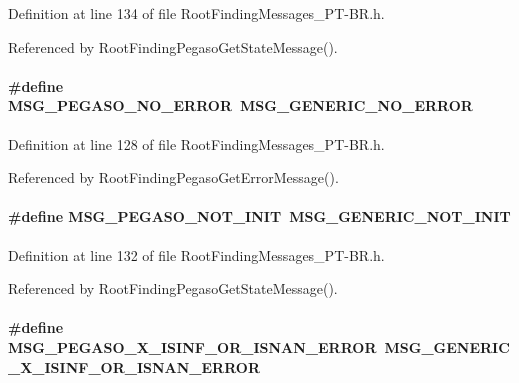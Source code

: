 Definition at line 134 of file RootFindingMessages\_\-PT-BR.h.

Referenced by RootFindingPegasoGetStateMessage().\hypertarget{group____messages_g007c9369adc25cf104727b8838460c48}{
\paragraph[MSG\_\-PEGASO\_\-NO\_\-ERROR]{\setlength{\rightskip}{0pt plus 5cm}\#define MSG\_\-PEGASO\_\-NO\_\-ERROR~MSG\_\-GENERIC\_\-NO\_\-ERROR}\hfill}
\label{group____messages_g007c9369adc25cf104727b8838460c48}




Definition at line 128 of file RootFindingMessages\_\-PT-BR.h.

Referenced by RootFindingPegasoGetErrorMessage().\hypertarget{group____messages_ga35bc5993a30a166820f1bbf7843646d}{
\paragraph[MSG\_\-PEGASO\_\-NOT\_\-INIT]{\setlength{\rightskip}{0pt plus 5cm}\#define MSG\_\-PEGASO\_\-NOT\_\-INIT~MSG\_\-GENERIC\_\-NOT\_\-INIT}\hfill}
\label{group____messages_ga35bc5993a30a166820f1bbf7843646d}




Definition at line 132 of file RootFindingMessages\_\-PT-BR.h.

Referenced by RootFindingPegasoGetStateMessage().\hypertarget{group____messages_g0785e9a82bbfd11bf313a7bde2f302dd}{
\paragraph[MSG\_\-PEGASO\_\-X\_\-ISINF\_\-OR\_\-ISNAN\_\-ERROR]{\setlength{\rightskip}{0pt plus 5cm}\#define MSG\_\-PEGASO\_\-X\_\-ISINF\_\-OR\_\-ISNAN\_\-ERROR~MSG\_\-GENERIC\_\-X\_\-ISINF\_\-OR\_\-ISNAN\_\-ERROR}\hfill}
\label{group____messages_g0785e9a82bbfd11bf313a7bde2f302dd}




